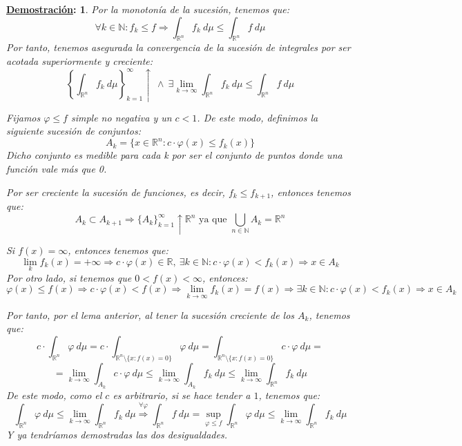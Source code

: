 \documentclass[10pt,a4paper,openright]{book}
\theoremstyle{break}
\newtheorem*{demo}{\underline{Demostración}:}
\begin{document}
\begin{demo}
Por la monotonía de la sucesión, tenemos que:
$$\forall k \in \mathbb{N}: f_k \le f \Rightarrow \int_{\mathbb{R}^n} f_k \ d \mu \le \int_{\mathbb{R}^n} f \ d \mu$$
Por tanto, tenemos asegurada la convergencia de la sucesión de integrales por ser acotada superiormente y creciente:
$$\left\lbrace \int_{\mathbb{R}^n} f_k \ d \mu \right\rbrace_{k=1}^{\infty}\uparrow \ \wedge \ \exists \lim_{k\rightarrow\infty} \int_{\mathbb{R}^n} f_k \ d \mu \le \int_{\mathbb{R}^n}f \ d \mu$$

Fijamos $\varphi \le f$ simple no negativa y un $c < 1$. De este modo, definimos la siguiente sucesión de conjuntos:
$$A_k = \{x \in \mathbb{R}^n: c\cdot \varphi\left(x\right) \leq f_k\left(x\right)\}$$
Dicho conjunto es medible para cada k por ser el conjunto de puntos donde una función vale más que 0.

Por ser creciente la sucesión de funciones, es decir, $f_k \le f_{k+1}$, entonces tenemos que:
$$A_k \subset A_{k+1} \Rightarrow \{A_k\}_{k=1}^{\infty} \uparrow \mathbb{R}^n \mbox{ ya que }\bigcup_{n\in \mathbb{N}}A_k = \mathbb{R}^n$$

Si $f(x) = \infty$, entonces tenemos que:
$$\lim_k f_k \left(x\right) = +\infty \Rightarrow c\cdot \varphi\left(x\right) \in \mathbb{R},\ \exists k \in \mathbb{N} : c\cdot \varphi\left(x\right) < f_k\left(x\right) \Rightarrow x \in A_k$$
Por otro lado, si tenemos que $0 < f\left(x\right) < \infty $, entonces:
$$\varphi\left(x\right) \le f\left(x\right) \Rightarrow c\cdot \varphi\left(x\right) < f\left(x\right) \Rightarrow \lim_{k\rightarrow\infty} f_k\left(x\right) = f\left(x\right) \Rightarrow \exists k \in \mathbb{N} : c\cdot \varphi\left(x\right) < f_k\left(x\right)\Rightarrow x\in A_k$$

Por tanto, por el lema anterior, al tener la sucesión creciente de los $A_k$, tenemos que:
$$c \cdot \int_{\mathbb{R}^n}\varphi \ d \mu = c\cdot \int_{\mathbb{R}^n \setminus \{x : f\left(x\right) = 0\}}\varphi \ d \mu = \int_{\mathbb{R}^n \setminus \{x : f\left(x\right) = 0\}} c  \cdot \varphi \ d \mu = $$
$$=\lim_{k\rightarrow\infty} \int_{A_k} c \cdot \varphi \ d \mu \le \lim_{k\rightarrow\infty} \int_{A_k} f_k \ d \mu \le \lim_{k\rightarrow\infty} \int_{\mathbb{R}^n} f_k \ d \mu$$
De este modo, como el $c$ es arbitrario, si se hace tender a $1$, tenemos que:
$$\int_{\mathbb{R}^n} \varphi \ d \mu \le \lim_{k\rightarrow\infty} \int_{\mathbb{R}^n} f_k \ d \mu \stackrel{\forall \varphi}{\Rightarrow} \int_{\mathbb{R}^n}f \ d \mu = \sup_{\varphi \le f} \int_{\mathbb{R}^n}\varphi \ d \mu \le \lim_{k\rightarrow\infty} \int_{\mathbb{R}^n}f_k \ d \mu$$
Y ya tendríamos demostradas las dos desigualdades.
\end{demo}
\end{document}

